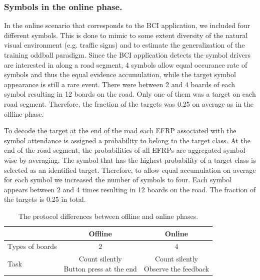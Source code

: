 \documentclass[12pt]{iopart}
\begin{document}
\subsubsection*{Symbols in the online phase.}
In the online scenario that corresponds to the BCI application, we included four different symbols. This is done to mimic to some extent diversity of the natural visual environment (e.g. traffic signs) and to estimate the generalization of the training oddball paradigm. Since the BCI application detects the symbol drivers are interested in along a road segment, 4 symbols allow equal occurance rate of symbols and thus the equal evidence accumulation, while the target symbol appearance is still a rare event. 
There were between 2 and 4 boards of each symbol resulting in 12 boards on the road.
Only one of them was a target on each road segment. Therefore, the fraction
of the targets was 0.25 on average as in the offline phase.


To decode the target at the end of the road each EFRP associated with the
symbol attendance
is assigned a probability to belong to the target class.
At the end of the road segment, the probabilities
of all EFRPs are aggregated symbol-wise by averaging.
The symbol that has the highest probability of a target class
is selected as an identified target.
Therefore, to allow equal accumulation on average for each symbol 
we increased the number of symbols to four.
Each symbol appears between 2 and 4 times
resulting in 12 boards on the road.
The fraction of the targets is 0.25 in total.



\begin{table}
    \centering
    \caption{The protocol differences between offline and online phases.}
    \begin{tabular}{l | c | c}
        \hline 
        & Offline & Online \\
        \hline 
        Types of boards & 2 & 4 \\
        \hline
        Task & \shortstack{Count silently \\ Button press at the end} & \shortstack{Count silently \\ Observe the feedback} \\
        \hline 
    \end{tabular}
    \label{tab:OffOn}
\end{table}
\end{document}

